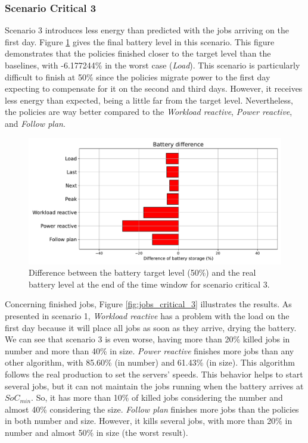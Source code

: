 \subsubsection{Scenario Critical 3}
Scenario 3 introduces less energy than predicted with the jobs arriving on the first day. Figure \ref{fig:SoC_critical_3} gives the final battery level in this scenario. This figure demonstrates that the policies finished closer to the target level than the baselines, with -6.177244\% in the worst case (\emph{Load}). This scenario is particularly difficult to finish at 50\% since the policies migrate power to the first day expecting to compensate for it on the second and third days. However, it receives less energy than expected, being a little far from the target level. Nevertheless, the policies are way better compared to the \emph{Workload reactive}, \emph{Power reactive}, and \emph{Follow plan}.

\begin{figure}[!htb]
    \centering
    \includegraphics[scale=0.55]{Images/Compensations/battery_critical_3.pdf}
    \caption{Difference between the battery target level (50\%) and the real battery level at the end of the time window for scenario critical 3.}
    \label{fig:SoC_critical_3}
\end{figure}

Concerning finished jobs, Figure \ref{fig:jobs_critical_3} illustrates the results. As presented in scenario 1, \emph{Workload reactive} has a problem with the load on the first day because it will place all jobs as soon as they arrive, drying the battery. We can see that scenario 3 is even worse, having more than 20\% killed jobs in number and more than 40\% in size. \emph{Power reactive} finishes more jobs than any other algorithm, with 85.60\% (in number) and 61.43\% (in size). This algorithm follows the real production to set the servers' speeds. This behavior helps to start several jobs, but it can not maintain the jobs running when the battery arrives at $SoC_{min}$. So, it has more than 10\% of killed jobs considering the number and almost 40\% considering the size. \emph{Follow plan} finishes more jobs than the policies in both number and size. However, it kills several jobs, with more than 20\% in number and almost 50\% in size (the worst result). 

